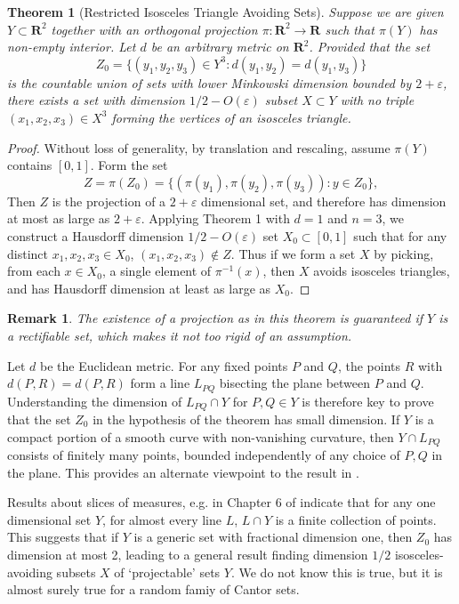 \documentclass[dvipsnames]{article}
\theoremstyle{plain}
\theoremstyle{plain}
\newtheorem{theorem}{Theorem}
\newtheorem*{remark}{Remark}
\begin{document}
\begin{theorem}[Restricted Isosceles Triangle Avoiding Sets]
	Suppose we are given $Y \subset \mathbf{R}^2$ together with an orthogonal projection $\pi: \mathbf{R}^2 \to \mathbf{R}$ such that $\pi(Y)$ has non-empty interior. Let $d$ be an arbitrary metric on $\mathbf{R}^2$. Provided that the set
	\[ Z_0 = \{ (y_1,y_2,y_3) \in Y^3 : d(y_1,y_2) = d(y_1,y_3) \} \]
	is the countable union of sets with lower Minkowski dimension bounded by $2 + \varepsilon$, there exists a set with dimension $1/2 - O(\varepsilon)$ subset $X \subset Y$ with no triple $(x_1,x_2,x_3) \in X^3$ forming the vertices of an isosceles triangle.
\end{theorem}
\begin{proof}
	Without loss of generality, by translation and rescaling, assume $\pi(Y)$ contains $[0,1]$. Form the set
	\[ Z = \pi(Z_0) = \{ (\pi(y_1), \pi(y_2), \pi(y_3)) : y \in Z_0 \}, \]
	Then $Z$ is the projection of a $2 + \varepsilon$ dimensional set, and therefore has dimension at most as large as $2 + \varepsilon$. Applying Theorem 1 with $d = 1$ and $n = 3$, we construct a Hausdorff dimension $1/2 - O(\varepsilon)$ set $X_0 \subset [0,1]$ such that for any distinct $x_1, x_2, x_3 \in X_0$, $(x_1, x_2, x_3) \not \in Z$. Thus if we form a set $X$ by picking, from each $x \in X_0$, a single element of $\pi^{-1}(x)$, then $X$ avoids isosceles triangles, and has Hausdorff dimension at least as large as $X_0$.
\end{proof}

\begin{remark}
	The existence of a projection as in this theorem is guaranteed if $Y$ is a rectifiable set, which makes it not too rigid of an assumption. 
\end{remark}

Let $d$ be the Euclidean metric. For any fixed points $P$ and $Q$, the points $R$ with $d(P,R) = d(P,R)$ form a line $L_{PQ}$ bisecting the plane between $P$ and $Q$. Understanding the dimension of $L_{PQ} \cap Y$ for $P,Q \in Y$ is therefore key to prove that the set $Z_0$ in the hypothesis of the theorem has small dimension. If $Y$ is a compact portion of a smooth curve with non-vanishing curvature, then $Y \cap L_{PQ}$ consists of finitely many points, bounded independently of any choice of $P,Q$ in the plane. This provides an alternate viewpoint to the result in \cite{MalabikaRob}.

Results about slices of measures, e.g. in Chapter 6 of \cite{Matilla} indicate that for any one dimensional set $Y$, for almost every line $L$, $L \cap Y$ is a finite collection of points. This suggests that if $Y$ is a generic set with fractional dimension one, then $Z_0$ has dimension at most 2, leading to a general result finding dimension $1/2$ isosceles-avoiding subsets $X$ of `projectable' sets $Y$. We do not know this is true, but it is almost surely true for a random famiy of Cantor sets.
\end{document}
